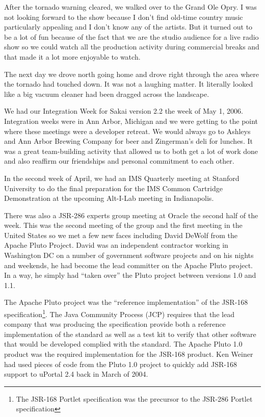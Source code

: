 \documentclass[12pt]{book}
\begin{document}
After the tornado warning cleared, we walked over to the Grand Ole Opry.
I was not looking forward to the show because I don't find old-time
country music particularly appealing and I don't know any of the artists.
But it turned out to be a lot of fun because of the fact that we are the studio
audience for a live radio show so we could watch all the production activity
during commercial breaks and that made it a lot more enjoyable to watch.

The next day we drove north going home and drove right through the area where
the tornado had touched down.  It was not a laughing matter.  It literally
looked like a big vacuum cleaner had been dragged across the landscape.

We had our Integration Week for Sakai version 2.2 the week of May 1, 2006.
Integration weeks were in Ann Arbor, Michigan and we were getting to the
point where these meetings were a developer retreat.   We would always go to
Ashleys and Ann Arbor Brewing Company for beer and Zingerman's deli for lunches.
It was a great team-building activity that allowed us to both get a lot of
work done and also reaffirm our friendships and personal commitment
to each other.

In the second week of April, we had an IMS Quarterly meeting at
Stanford University to do the final preparation for the IMS
Common Cartridge Demonstration at the upcoming Alt-I-Lab
meeting in Indianapolis.

There was also a JSR-286 experts group meeting at Oracle the second
half of the week.  This was the second meeting of the group and the first meeting
in the United States so we met a few new faces including David DeWolf
from the Apache Pluto Project.  David was an independent
contractor working in Washington DC on a number of government software projects
and on his nights and weekends, he had become the lead committer on the
Apache Pluto project.  In a way, he simply had ``taken over'' the Pluto project
between versions 1.0 and 1.1.

The Apache Pluto project was the ``reference implementation'' of the JSR-168
specification\footnote{The JSR-168 Portlet specification was the precursor to the
JSR-286 Portlet specification}.
The Java Community Process (JCP) requires that the lead
company that was producing the specification provide both a reference
implementation of the standard as well as a test kit to verify that other
software that would be developed complied with the standard.  The Apache Pluto
1.0 product was the required implementation for the JSR-168 product.
Ken Weiner had used pieces of code from the Pluto
1.0 project to quickly add JSR-168 support to uPortal 2.4 back in March of 2004.
\end{document}
